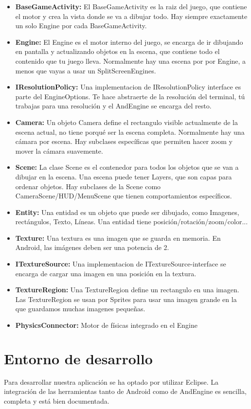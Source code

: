 \documentclass[12 pt, a4paper, twoside]{article}
\begin{document}
\begin{itemize}
\item \textbf{BaseGameActivity:} El BaseGameActivity es la raiz del
  juego, que contiene el motor y crea la vista donde se va a dibujar
  todo. Hay siempre exactamente un solo Engine por cada
  BaseGameActivity.
\item \textbf{Engine:} El Engine es el motor interno del juego, se
  encarga de ir dibujando en pantalla y actualizando objetos en la
  escena, que contiene todo el contenido que tu juego
  lleva. Normalmente hay una escena por por Engine, a menos que vayas
  a usar un SplitScreenEngines.
\item \textbf{IResolutionPolicy:} Una implementacion de
  IResolutionPolicy interface es parte del EngineOptions. Te hace
  abstraerte de la resolución del terminal, tú trabajas para una
  resolución y el AndEngine se encarga del resto.
\item \textbf{Camera:} Un objeto Camera define el rectangulo visible
  actualmente de la escena actual, no tiene porqué ser la escena
  completa. Normalmente hay una cámara por escena. Hay subclases
  específicas que permiten hacer zoom y mover la cámara suavemente.
\item \textbf{Scene:} La clase Scene es el contenedor para todos los
  objetos que se van a dibujar en la escena. Una escena puede tener
  Layers, que son capas para ordenar objetos. Hay subclases de la
  Scene como CameraScene/HUD/MenuScene que tienen comportamientos
  específicos.
\item \textbf{Entity:} Una entidad es un objeto que puede ser
  dibujado, como Imagenes, rectángulos, Texto, Líneas. Una entidad
  tiene posición/rotación/zoom/color...
\item \textbf{Texture:} Una textura es una imagen que se guarda en
  memoria. En Android, las imágenes deben ser una potencia de 2.
\item \textbf{ITextureSource:} Una implementacion de
  ITextureSource-interface se encarga de cargar una imagen en una
  posición en la textura.
\item \textbf{TextureRegion:} Una TextureRegion define un rectangulo
  en una imagen. Las TextureRegion se usan por Sprites para usar una
  imagen grande en la que guardamos muchas imagenes pequeñas.
\item \textbf{PhysicsConnector:} Motor de físicas integrado en el Engine
\end{itemize}

\section{Entorno de desarrollo}
Para desarrollar nuestra aplicación se ha optado por utilizar
Eclipse. La integración de las herramientas tanto de Android como de
AndEngine es sencilla, completa y está bien documentada.
\end{document}
